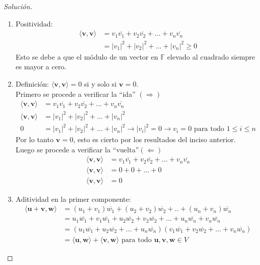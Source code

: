 \documentclass[12pt]{book}
\newcommand{\F}{\mathbb{F}}
\newcommand{\todo}{\textrm{ para todo }}
\newenvironment{solucion}
  {\renewcommand\qedsymbol{$\square$}\begin{proof}[Solución]}
  {\end{proof}}
\begin{document}
\begin{solucion}
\begin{enumerate}
    \item Positividad: 
    \begin{align*}
        \langle \textbf{v},\textbf{v} \rangle &= v_1\overline{v_1}+v_2\overline{v_2}+...+v_n\overline{v_n} \\
        &= |v_1|^2+|v_2|^2+...+|v_n|^2\geq 0 
    \end{align*}
    Esto se debe a que el módulo de un vector en $\F$ elevado al cuadrado siempre es mayor a cero.
    
    \item Definición: $\langle \textbf{v},\textbf{v} \rangle=0$  si y solo si $\textbf{v} = 0$. \\
    Primero se procede a verificar la ``ida'' $(\Rightarrow)$
    \begin{align*}
        \langle \textbf{v},\textbf{v} \rangle &= v_1\overline{v_1}+v_2\overline{v_2}+...+v_n\overline{v_n}\\
        \langle \textbf{v},\textbf{v} \rangle &= |v_1|^2+|v_2|^2+...+|v_n|^2\\
        0 &= |v_1|^2+|v_2|^2+...+|v_n|^2\rightarrow |v_i|^2=0\rightarrow v_i=0 \todo 1\leq i\leq n
    \end{align*}
    Por lo tanto $\textbf{v}=0$, esto es cierto por los resultados del inciso anterior.\\ 
    Luego se procede a verificar la ``vuelta''$(\Leftarrow)$
    \begin{align*}
        \langle \textbf{v},\textbf{v} \rangle &= v_1\overline{v_1}+v_2\overline{v_2}+...+v_n\overline{v_n}\\
        \langle \textbf{v},\textbf{v} \rangle &= 0+0+...+0\\
         \langle \textbf{v},\textbf{v} \rangle &=0
    \end{align*}
   
    \item  Aditividad en la primer componente: 
    \begin{align*}
        \langle \textbf{u}+\textbf{v},\textbf{w} \rangle &= (u_1+v_1)\overline{w_1}+(u_2+v_2)\overline{w_2}+..+(u_n+v_n)\overline{w_n}\\
        &=u_1\overline{w_1}+v_1\overline{w_1}+u_2\overline{w_2}+v_2\overline{w_2}+...+u_n\overline{w_n}+v_n\overline{w_n}\\
        &=(u_1\overline{w_1}+u_2\overline{w_2}+...+u_n\overline{w_n})(v_1\overline{w_1}+v_2\overline{w_2}+...+v_n\overline{w_n})\\
        &=\langle \textbf{u},\textbf{w} \rangle + \langle \textbf{v},\textbf{w} \rangle\todo\textbf{u},\textbf{v},\textbf{w} \in V
    \end{align*}
    

\end{enumerate}
\end{solucion}
\end{document}
